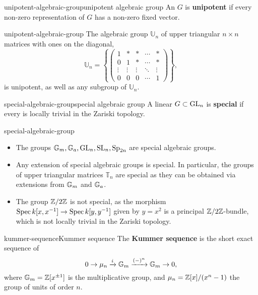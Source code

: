 \begin{topic}{unipotent-algebraic-group}{unipotent algebraic group}
    An  $G$ is \textbf{unipotent} if every non-zero representation of $G$ has a non-zero fixed vector.
\end{topic}

\begin{example}{unipotent-algebraic-group}
    The algebraic group $\mathbb{U}_n$ of upper triangular $n \times n$ matrices with ones on the diagonal,
    \[ \mathbb{U}_n = \left\{ \begin{pmatrix} 1 & * & * & \cdots & * \\ 0 & 1 & * & \cdots & * \\ \vdots & \vdots & \vdots & \ddots & \vdots \\ 0 & 0 & 0 & \cdots & 1 \end{pmatrix} \right\} , \]
    is unipotent, as well as any subgroup of $\mathbb{U}_n$.
\end{example}

\begin{topic}{special-algebraic-group}{special algebraic group}
    A linear  $G \subset \textup{GL}_n$ is \textbf{special} if every  is locally trivial in the Zariski topology.
\end{topic}

\begin{example}{special-algebraic-group}
    \begin{itemize}
        \item The groups $\mathbb{G}_m, \mathbb{G}_a, \textup{GL}_n, \textup{SL}_n, \textup{Sp}_{2n}$ are special algebraic groups.
        \item Any extension of special algebraic groups is special. In particular, the groups of upper triangular matrices $\mathbb{T}_n$ are special as they can be obtained via extensions from $\mathbb{G}_m$ and $\mathbb{G}_a$.
        \item The group $\mathbb{Z}/2\mathbb{Z}$ is not special, as the morphism $\operatorname{Spec} k[x, x^{-1}] \to \operatorname{Spec} k[y, y^{-1}]$ given by $y = x^2$ is a principal $\mathbb{Z}/2\mathbb{Z}$-bundle, which is not locally trivial in the Zariski topology.
    \end{itemize}
\end{example}

\begin{topic}{kummer-sequence}{Kummer sequence}
    The \textbf{Kummer sequence} is the short exact sequence of 
    \[ 0 \to \mu_n \xrightarrow{i} \mathbb{G}_m \xrightarrow{(-)^n} \mathbb{G}_m \to 0 , \]
    where $\mathbb{G}_m = \mathbb{Z}[x^{\pm 1}]$ is the multiplicative group, and $\mu_n = \mathbb{Z}[x] / (x^n - 1)$ the group of units of order $n$.
\end{topic}

